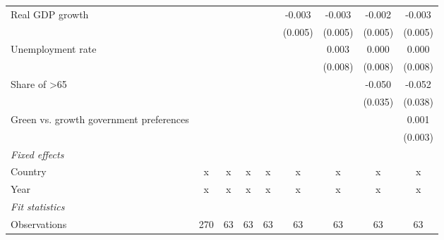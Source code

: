 \begin{table}[htbp]
\begin{tabular}{lcccccccc}
      Real GDP growth                                                        &         &         &               &                & -0.003         & -0.003         & -0.002         & -0.003\\   
                                                                             &         &         &               &                & (0.005)        & (0.005)        & (0.005)        & (0.005)\\   
      Unemployment rate                                                      &         &         &               &                &                & 0.003          & 0.000          & 0.000\\   
                                                                             &         &         &               &                &                & (0.008)        & (0.008)        & (0.008)\\   
      Share of >65                                                           &         &         &               &                &                &                & -0.050         & -0.052\\   
                                                                             &         &         &               &                &                &                & (0.035)        & (0.038)\\   
      Green vs. growth government preferences                                &         &         &               &                &                &                &                & 0.001\\   
                                                                             &         &         &               &                &                &                &                & (0.003)\\   
      \emph{Fixed effects}\\
      Country                                                                & x       & x       & x             & x              & x              & x              & x              & x\\  
      Year                                                                   & x       & x       & x             & x              & x              & x              & x              & x\\  
      \midrule \emph{Fit statistics}\\
      Observations                                                           & 270     & 63      & 63            & 63             & 63             & 63             & 63             & 63\\  

\end{tabular}
\end{table}
